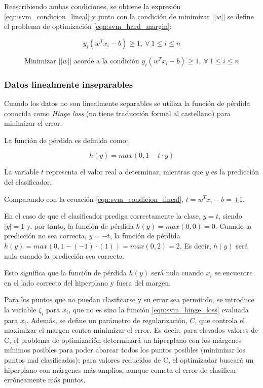 Reescribiendo ambas condiciones, se obtiene la expresión \ref{eqn:svm_condicion_lineal} y junto con la condición de minimizar $||w||$ se define el problema de optimización \ref{eqn:svm_hard_margin}:

\begin{equation}
	y_{i}\left(w^{T}x_{i}-b\right)\geq1,\: \forall\: 1\leq i\leq n
	\label{eqn:svm_condicion_lineal}
\end{equation}

\begin{equation}
	\mbox{Minimizar } ||w|| \mbox{ acorde a la condición } y_{i}\left(w^{T}x_{i}-b\right)\geq1,\: \forall\: 1\leq i\leq n
	\label{eqn:svm_hard_margin}
\end{equation}

\subsubsection{Datos linealmente inseparables}

Cuando los datos no son linealmente separables se utiliza la función de pérdida conocida como \textit{Hinge loss} (no tiene traducción formal al castellano) para minimizar el error.


La función de pérdida es definida como:

\begin{equation}
	h(y) = max\left(0,1-t\cdot y\right)
	\label{eqn:svm_hinge_loss}
\end{equation}

La variable $t$ representa el valor real a determinar, mientras que $y$ es la predicción del clasificador. 

Comparando con la ecuación \ref{eqn:svm_condicion_lineal}, $t = w^{T}x_{i}-b = \pm 1$.

En el caso de que el clasificador prediga correctamente la clase, $y = t$, siendo $|y| = 1$ y, por tanto, la función de pérdida $h(y) = max(0,0) = 0$. Cuando la predicción no sea correcta, $y = -t$, la función de pérdida $h(y) = max(0,1-(-1)\cdot(1)) = max(0,2) = 2$. Es decir, $h(y)$ será nula cuando la predicción sea correcta.

Esto significa que la función de pérdida $h(y)$ será nula cuando $x_{i}$ se encuentre en el lado correcto del hiperplano y fuera del margen. 

Para los puntos que no puedan clasificarse y su error sea permitido, se introduce la variable $\zeta_{i}$ para $x_{i}$, que no es sino la función \ref{eqn:svm_hinge_loss} evaluada para $x_{i}$. Además, se define un parámetro de regularización, $C$, que controla el maximizar el margen contra minimizar el error. Es decir, para elevados valores de C, el problema de optimización determinará un hiperplano con los márgenes mínimos posibles para poder abarcar todos los puntos posibles (minimizar los puntos mal clasificados); para valores reducidos de C, el optimizador buscará un hiperplano con márgenes más amplios, aunque cometa el error de clasificar erróneamente más puntos.

